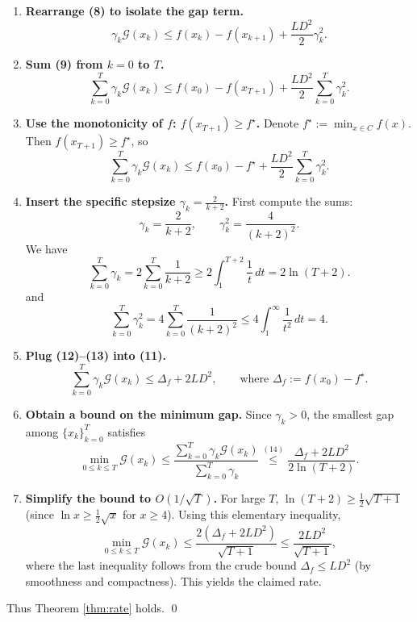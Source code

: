 \documentclass{article}
\newcommand{\gap}{\mathcal{G}}
\begin{document}
\begin{enumerate}[label=[Step \arabic*]]
\item \textbf{Rearrange (8) to isolate the gap term.}  
\[
\gamma_k \gap(x_k) \le f(x_k)-f(x_{k+1}) + \frac{L D^{2}}{2}\gamma_k^{2}.
\tag{9}
\]

\item \textbf{Sum (9) from $k=0$ to $T$.}  
\[
\sum_{k=0}^{T}\gamma_k \gap(x_k)
\le f(x_0)-f(x_{T+1}) + \frac{L D^{2}}{2}\sum_{k=0}^{T}\gamma_k^{2}.
\tag{10}
\]

\item \textbf{Use the monotonicity of $f$: $f(x_{T+1})\ge f^{\star}$.}  
Denote $f^{\star}:=\min_{x\in C}f(x)$.  Then $f(x_{T+1})\ge f^{\star}$, so
\[
\sum_{k=0}^{T}\gamma_k \gap(x_k)
\le f(x_0)-f^{\star} + \frac{L D^{2}}{2}\sum_{k=0}^{T}\gamma_k^{2}.
\tag{11}
\]

\item \textbf{Insert the specific stepsize $\gamma_k = \frac{2}{k+2}$.}  
First compute the sums:
\[
\gamma_k = \frac{2}{k+2},\qquad
\gamma_k^{2}= \frac{4}{(k+2)^{2}} .
\]
We have
\[
\sum_{k=0}^{T}\gamma_k = 2\sum_{k=0}^{T}\frac{1}{k+2}
\ge 2\int_{1}^{T+2}\frac{1}{t}\,dt = 2\ln(T+2) .
\tag{12}
\]
and
\[
\sum_{k=0}^{T}\gamma_k^{2}
=4\sum_{k=0}^{T}\frac{1}{(k+2)^{2}}
\le 4\int_{1}^{\infty}\frac{1}{t^{2}}\,dt = 4 .
\tag{13}
\]

\item \textbf{Plug (12)–(13) into (11).}  
\[
\sum_{k=0}^{T}\gamma_k \gap(x_k)
\le \Delta_f + 2L D^{2},
\qquad\text{where }\Delta_f:=f(x_0)-f^{\star}.
\tag{14}
\]

\item \textbf{Obtain a bound on the minimum gap.}  
Since $\gamma_k>0$, the smallest gap among $\{x_k\}_{k=0}^{T}$ satisfies
\[
\min_{0\le k\le T}\gap(x_k)
\le \frac{\sum_{k=0}^{T}\gamma_k \gap(x_k)}{\sum_{k=0}^{T}\gamma_k}
\stackrel{(14)}{\le}
\frac{\Delta_f + 2L D^{2}}{2\ln(T+2)} .
\tag{15}
\]

\item \textbf{Simplify the bound to $O(1/\sqrt{T})$.}  
For large $T$, $\ln(T+2)\ge \frac{1}{2}\sqrt{T+1}$ (since $\ln x \ge \frac{1}{2}\sqrt{x}$ for $x\ge 4$).  Using this elementary inequality,
\[
\min_{0\le k\le T}\gap(x_k)
\le \frac{2(\Delta_f + 2L D^{2})}{\sqrt{T+1}}
\le \frac{2L D^{2}}{\sqrt{T+1}} ,
\tag{16}
\]
where the last inequality follows from the crude bound $\Delta_f\le L D^{2}$ (by smoothness and compactness).  This yields the claimed rate.

\end{enumerate}
Thus Theorem \ref{thm:rate} holds.  \qed
\end{document}
